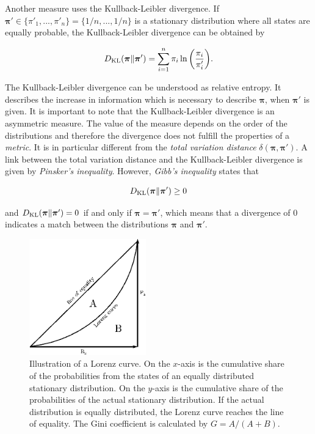 
Another measure uses the Kullback-Leibler divergence. If $\bm\pi' \in \{\pi'_1, ..., \pi'_n\} = \{1/n, ..., 1/n\}$ is a stationary distribution where all states are equally probable, the Kullback-Leibler divergence can be obtained by

\begin{equation}
\label{eq:kullbackleibler}
D_{\text{KL}}(\bm\pi\|\bm\pi') = \sum_{i=1}^n \pi_i \ln{\left(\frac{\pi_i}{\pi'_i}\right)}.
\end{equation}

The Kullback-Leibler divergence can be understood as relative entropy. It describes the increase in information which is necessary to describe $\bm\pi$, when $\bm\pi'$ is given. It is important to note that the Kullback-Leibler divergence is an asymmetric measure. The value of the measure depends on the order of the distributions and therefore the divergence does not fulfill the properties of a \emph{metric}. It is in particular different from the \emph{total variation distance} $\delta(\bm\pi, \bm\pi')$. A link between the total variation distance and the Kullback-Leibler divergence is given by \emph{Pinsker's inequality}. However, \emph{Gibb's inequality} states that

\begin{equation}
\label{eq:kullbackleibler-gibbs}
D_{\text{KL}}(\bm\pi\|\bm\pi') \ge 0
\end{equation}

and $D_{\text{KL}}(\bm\pi\|\bm\pi') = 0$ if and only if $\bm\pi = \bm\pi'$, which means that a divergence of $0$ indicates a match between the distributions $\bm\pi$ and $\bm\pi'$.

\begin{figure}
    \includegraphics[width=0.45\textwidth]{sorn_markov/lorenz}
    \caption[Lorenz curve]{Illustration of a Lorenz curve. On the $x$-axis is the cumulative share of the probabilities from the states of an equally distributed stationary distribution. On the $y$-axis is the cumulative share of the probabilities of the actual stationary distribution. If the actual distribution is equally distributed, the Lorenz curve reaches the line of equality. The Gini coefficient is calculated by $G = A / (A+B)$.}
    \label{fig:lorenz-illustration}
\end{figure}


